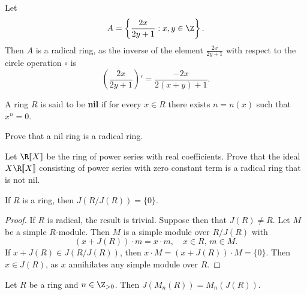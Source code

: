 \begin{example}
	Let 
	\[
	A=\left\{\frac{2x}{2y+1}:x,y\in\Z\right\}.
	\]
	Then $A$ is a radical ring, as the inverse of the element $\frac{2x}{2y+1}$
	with respect to the circle operation 
	$\circ$ is 
	\[
	\left(\frac{2x}{2y+1}\right)'=\frac{-2x}{2(x+y)+1}.
	\]
\end{example}

\begin{definition}
A ring $R$ is said to be \textbf{nil} if for every $x\in R$ there
exists $n=n(x)$ such that $x^n=0$. 
\end{definition}

\begin{exercise}
    Prove that a nil ring is a radical ring. 
\end{exercise}

\begin{exercise}
    Let $\R[\![X]\!]$ be the ring of power series with real coefficients. Prove that the ideal 
    $X\R[\![X]\!]$ consisting of power series with zero constant term is a radical ring
    that is not nil. 
\end{exercise}

\begin{theorem}
	\label{thm:J(R/J)=0}
	If $R$ is a ring, then $J(R/J(R))=\{0\}$.
\end{theorem}

\begin{proof}
	If $R$ is radical, the result is trivial. Suppose then that 
	$J(R)\ne R$. Let $M$ be a simple $R$-module. Then $M$ is 
	a simple module over $R/J(R)$ with 
	\[
		(x+J(R))\cdot m=x\cdot m,\quad
		x\in R,\,m\in M.
	\]
	If $x+J(R)\in J(R/J(R))$, then  $x\cdot M=(x+J(R))\cdot M=\{0\}$. Then $x\in J(R)$, as 
	$x$ annihilates any simple module over $R$.
\end{proof}



\begin{theorem}
	Let $R$ be a ring and $n\in\Z_{>0}$. Then $J(M_n(R))=M_n(J(R))$. 
\end{theorem}

